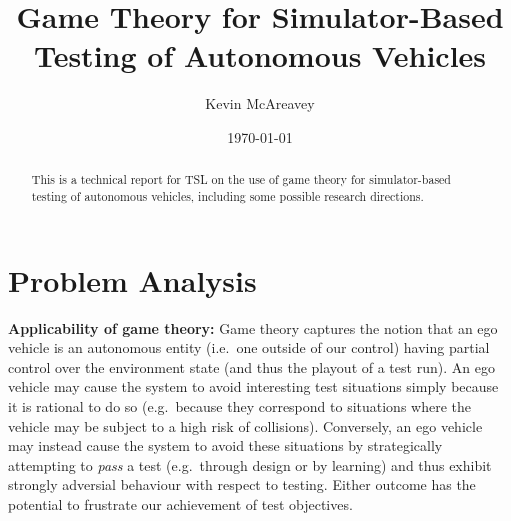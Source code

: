 \documentclass[10pt]{article}
\title{Game Theory for Simulator-Based Testing of Autonomous Vehicles}
\author{Kevin McAreavey}
\date{\today}
\theoremstyle{plain}
\newenvironment{note}[1][]{\par\smallskip\noindent\textbf{#1}\rmfamily}{\smallskip}
\begin{document}
\maketitle

\begin{abstract}
    This is a technical report for TSL on the use of game theory for simulator-based testing of autonomous vehicles, including some possible research directions.
\end{abstract}

\section{Problem Analysis}

\begin{note}[Applicability of game theory:]
    Game theory captures the notion that an ego vehicle is an autonomous entity (i.e.\ one outside of our control) having partial control over the environment state (and thus the playout of a test run).
    An ego vehicle may cause the system to avoid interesting test situations simply because it is rational to do so (e.g.\ because they correspond to situations where the vehicle may be subject to a high risk of collisions).
    Conversely, an ego vehicle may instead cause the system to avoid these situations by strategically attempting to \emph{pass} a test (e.g.\ through design or by learning) and thus exhibit strongly adversial behaviour with respect to testing.
    Either outcome has the potential to frustrate our achievement of test objectives.
\end{note}
\end{document}
